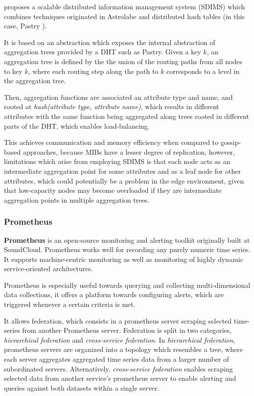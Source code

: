 \cite{SDIMS} proposes a scalable distributed information management system (SDIMS) which combines techniques originated in Astrolabe \cite{Renesse2003} and distributed hash tables (in this case, Pastry \cite{rowstron2001pastry}).

It is based on an abstraction which exposes the internal abstraction of aggregation trees provided by a DHT such as Pastry. Given a key $k$, an aggregation tree is defined by the the union of the routing paths from all nodes to key $k$, where each routing step along the path to $k$ corresponds to a level in the aggregation tree.

Then, aggregation functions are associated an attribute type and name, and rooted at \textit{hash(attribute type, attribute name)}, which results in different attributes with the same function being aggregated along trees rooted in different parts of the DHT, which enables load-balancing.

This achieves communication and memory efficiency when compared to gossip-based approaches, because MIBs have a lesser degree of replication, however, limitations which arise from employing SDIMS is that each node acts as an intermediate aggregation point for some attributes and as a leaf node for other attributes, which could potentially be a problem in the edge environment, given that low-capacity nodes may become overloaded if they are intermediate aggregation points in multiple aggregation trees. 

\subsubsection{Prometheus}

\textbf{Prometheus} \cite{prometheus} is an open-source monitoring and alerting toolkit originally built at SoundCloud. Prometheus works well for recording any purely numeric time series. It supports machine-centric monitoring as well as monitoring of highly dynamic service-oriented architectures. 

Prometheus is especially useful towards querying and collecting multi-dimensional data collections, it offers a platform towards configuring alerts, which are triggered whenever a certain criteria is met. 

It allows federation, which consists in a prometheus server scraping selected time-series from another Prometheus server. Federation is split in two categories, \textit{hierarchical federation} and \textit{cross-service federation}. In \textit{hierarchical federation}, prometheus servers are organized into a topology which resembles a tree, where each server aggregates aggregated time series data from a larger number of subordinated servers. Alternatively,  \textit{cross-service federation} enables scraping selected data from another service's prometheus server to enable alerting and queries against both datasets within a single server. 

